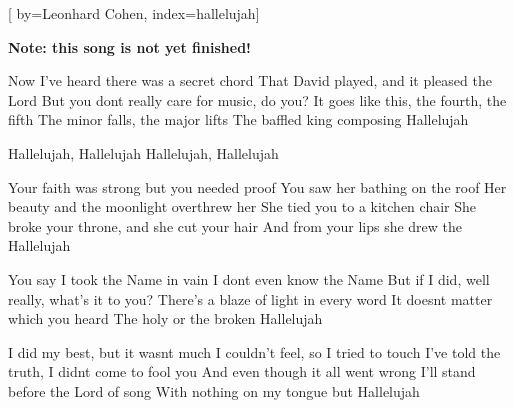 
[%
    by={Leonhard Cohen},
    index={hallelujah}]


    \label{hallelujah}

    \textbf{Note: this song is not yet finished!}

    \beginverse
        Now I've heard there was a secret chord
        That David played, and it pleased the Lord
        But you dont really care for music, do you?
        It goes like this, the fourth, the fifth
        The minor falls, the major lifts
        The baffled king composing Hallelujah
    \endverse

    \beginchorus
        Hallelujah, Hallelujah
        Hallelujah, Hallelujah
    \endchorus

    \beginverse
        Your faith was strong but you needed proof
        You saw her bathing on the roof
        Her beauty and the moonlight overthrew her
        She tied you to a kitchen chair
        She broke your throne, and she cut your hair
        And from your lips she drew the Hallelujah
    \endverse


    \beginverse
        You say I took the Name in vain
        I dont even know the Name
        But if I did, well really, what's it to you?
        There's a blaze of light in every word
        It doesnt matter which you heard
        The holy or the broken Hallelujah
    \endverse


    \beginverse
        I did my best, but it wasnt much
        I couldn't feel, so I tried to touch
        I've told the truth, I didnt come to fool you
        And even though it all went wrong
        I'll stand before the Lord of song
        With nothing on my tongue but Hallelujah
    \endverse

\endsong
